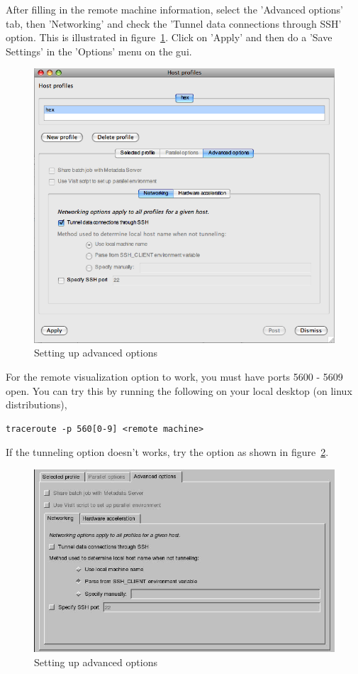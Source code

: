 \documentclass[12pt]{report}
\begin{document}
After filling in the remote machine information, select the 'Advanced options' tab, then 'Networking' and check the 'Tunnel data connections through SSH' option. This is illustrated in figure~\ref{VisItHostProfileAdv}. Click on 'Apply' and then do a 'Save Settings' in the 'Options' menu on the gui.

\begin{figure}
  \center
  \includegraphics[scale=0.5]{VisItHostProfileAdv.png}
  \caption{Setting up advanced options}
  \label{VisItHostProfileAdv}
\end{figure}

For the remote visualization option to work, you must have ports 5600 - 5609 open. You can try this by running the following on your local desktop (on linux distributions),

\begin{Verbatim}[fontsize=\footnotesize]
traceroute -p 560[0-9] <remote machine> 
\end{Verbatim}

If the tunneling option doesn't works, try the option as shown in figure~\ref{VisItHostProfileAdv2}.

\begin{figure}
  \center
  \includegraphics[scale=0.5]{VisItHostProfileAdv2.png}
  \caption{Setting up advanced options}
  \label{VisItHostProfileAdv2}
\end{figure}
\end{document}
